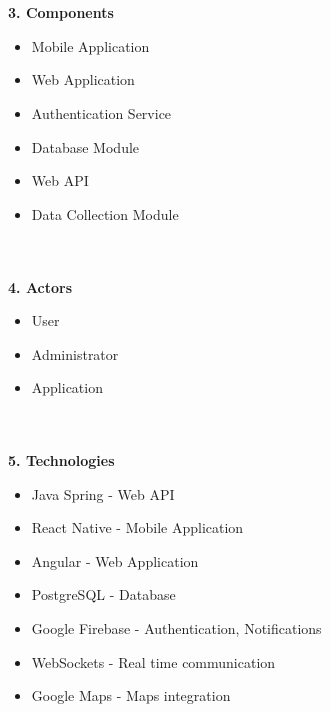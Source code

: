 \documentclass[a4paper]{article}
\begin{document}
\ \\ \ \\ 
\textbf{3. Components}
\begin{itemize}
\item Mobile Application
\item Web Application
\item Authentication Service
\item Database Module
\item Web API
\item Data Collection Module
\end{itemize}
\ \\ \ \\ 
\textbf{4. Actors}
\begin{itemize}
\item User
\item Administrator
\item Application
\end{itemize}
\ \\ \ \\ 
\textbf{5. Technologies}
\begin{itemize}
\item Java Spring - Web API
\item React Native - Mobile Application
\item Angular - Web Application
\item PostgreSQL - Database
\item Google Firebase - Authentication, Notifications
\item WebSockets - Real time communication
\item Google Maps - Maps integration
\end{itemize}
\ \\ \ \\ 
\end{document}
